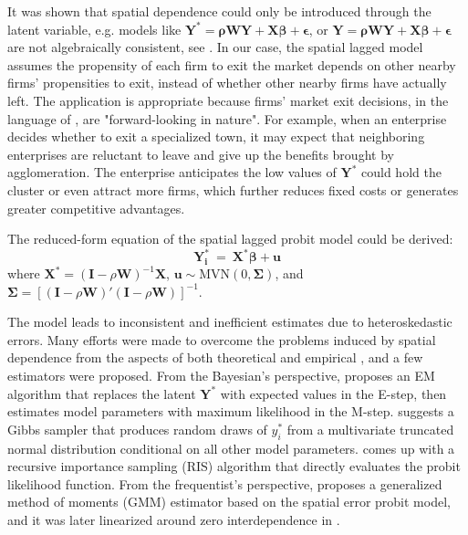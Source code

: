 It was shown that spatial dependence could only be introduced through the latent variable, e.g. models like $\bm{Y^*}=\bm{ \rho W Y }+\bm{ X \beta }+\bm{\epsilon}$, or $\bm{Y}=\bm{ \rho W Y }+\bm{ X \beta }+\bm{\epsilon}$ are not algebraically consistent, see \cite{beron2004probit, klier2008clustering}. In our case, the spatial lagged model assumes the propensity of each firm to exit the market depends on other nearby firms' propensities to exit, instead of whether other nearby firms have actually left. The application is appropriate because firms' market exit decisions, in the language of \cite{klier2008clustering}, are "forward-looking in nature". For example, when an enterprise decides whether to exit a specialized town, it may expect that neighboring enterprises are reluctant to leave and give up the benefits brought by agglomeration. The enterprise anticipates the low values of $\bm{Y^*}$ could hold the cluster or even attract more firms, which further reduces fixed costs or generates greater competitive advantages.

The reduced-form equation of the spatial lagged probit model could be derived:
\begin{equation}
  \nonumber
  \bm{Y_i^*} \  = \  \bm{X^*\beta} + \bm{u}
\end{equation}
where $\bm{X^*}=\left(\bm{I}-\rho\bm{W}\right)^{-1} \bm{X}$, $\bm{u} \sim \text{MVN}\left(0,\bm{\Sigma}\right)$, and $\bm{\Sigma}=\left[\left(\bm{I}-\rho\bm{W}\right)'\left(\bm{I}-\rho\bm{W}\right)\right]^{-1}$.

The model leads to inconsistent and inefficient estimates due to heteroskedastic errors. Many efforts were made to overcome the problems induced by spatial dependence from the aspects of both theoretical and empirical \cite{fleming2004techniques}, and a few estimators were proposed. From the Bayesian's perspective, \cite{mcmillen1992probit} proposes an EM algorithm that replaces the latent $\bm{Y^*}$ with expected values in the E-step, then estimates model parameters with maximum likelihood in the M-step. \cite{lesage2000bayesian} suggests a Gibbs sampler that produces random draws of $y_i^*$ from a multivariate truncated normal distribution conditional on all other model parameters. \cite{beron2004probit} comes up with a recursive importance sampling (RIS) algorithm that directly evaluates the probit likelihood function. From the frequentist's perspective, \cite{pinkse1998contracting} proposes a generalized method of moments (GMM) estimator based on the spatial error probit model, and it was later linearized around zero interdependence in \cite{klier2008clustering}.

